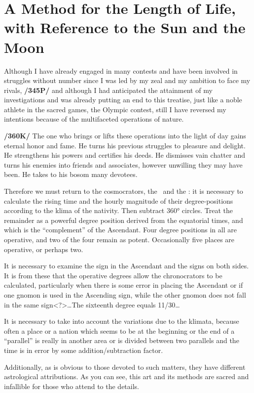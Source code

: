 \section{A Method for the Length of Life, with Reference to the Sun and the Moon}
Although I have already engaged in many contests and have been involved in struggles without number since I was led by my zeal and my ambition to face my rivals, \textbf{/345P/} and although I had
anticipated the attainment of my investigations and was already putting an end to this treatise, just like a noble athlete in the sacred games, the Olympic contest, still I have reversed my intentions because of the
multifaceted operations of nature. 

\textbf{/360K/} The one who brings or lifts these operations into the light of day gains eternal honor and fame. He turns his previous struggles to pleasure and delight. He strengthens his powers and certifies his deeds. He dismisses vain chatter and turns his enemies into friends and associates, however unwilling they may have been. He takes to his bosom many devotees.

Therefore we must return to the cosmocrators, the \Sun\, and the \Moon: it is necessary to calculate the rising time and the hourly magnitude of their degree-positions according to the klima of the nativity. Then subtract 360° circles. Treat the remainder as a powerful degree position derived from the equatorial times, and which is the “complement” of the Ascendant. Four degree positions in all are operative, and two of the four remain as potent. Occasionally five places are operative, or perhaps two.

It is necessary to examine the sign in the Ascendant and the signs on both sides. It is from these that the operative degrees allow the chronocrators to be calculated, particularly when there is some error in
placing the Ascendant or if one gnomon is used in the Ascending sign, while the other gnomon does not fall in the same sign<?>…The sixteenth degree equals 11/30…

It is necessary to take into account the variations due to the klimata, because often a place or a nation which seems to be at the beginning or the end of a “parallel” is really in another area or is divided between
two parallels and the time is in error by some addition/subtraction factor. 

Additionally, as is obvious to those devoted to such matters, they have different astrological attributions. As you can see, this art and its methods are sacred and infallible for those who attend to the details.

\newpage